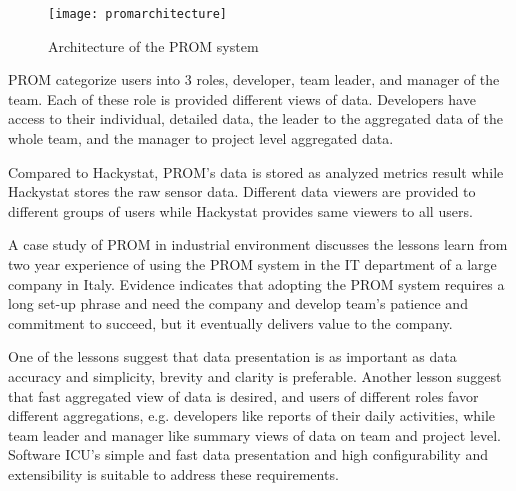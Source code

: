 \begin{figure}[htbp]
     \centering
     \texttt{[image: promarchitecture]}
     \caption{Architecture of the PROM system}
     \label{fig:promarchitecture}
\end{figure}

PROM categorize users into 3 roles, developer, team leader, and manager of the team. Each of these role is provided different views of data. Developers have access to their individual, detailed data, the leader to the aggregated data of the whole team, and the manager to project level aggregated data.

Compared to Hackystat, PROM's data is stored as analyzed metrics result while Hackystat stores the raw sensor data. Different data viewers are provided to different groups of users while Hackystat provides same viewers to all users.

A case study of PROM in industrial environment\cite{prom09} discusses the lessons learn from two year experience of using the PROM system in the IT department of a large company in Italy. Evidence indicates that adopting the PROM system requires a long set-up phrase and need the company and develop team's patience and commitment to succeed, but it eventually delivers value to the company. 

One of the lessons suggest that data presentation is as important as data accuracy and simplicity, brevity and clarity is preferable. Another lesson suggest that fast aggregated view of data is desired, and users of different roles favor different aggregations, e.g. developers like reports of their daily activities, while team leader and manager like summary views of data on team and project level. Software ICU's simple and fast data presentation and high configurability and extensibility is suitable to address these requirements.



